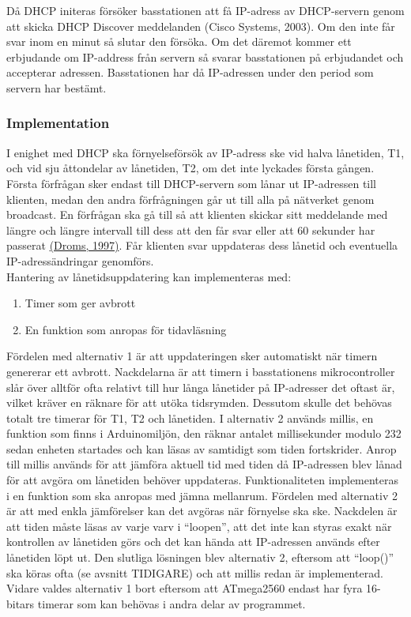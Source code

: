\documentclass[a4paper,11pt]{article}
\begin{document}
Då DHCP initeras försöker basstationen att få IP-adress av DHCP-servern genom att skicka DHCP Discover meddelanden (Cisco Systems, 2003). Om den inte får svar inom en minut så slutar den försöka. Om det däremot kommer ett erbjudande om IP-address från servern så svarar basstationen på erbjudandet och accepterar adressen. Basstationen har då IP-adressen under den period som servern har bestämt.    

\subsubsection{Implementation}
I enighet med DHCP ska förnyelseförsök av IP-adress ske vid halva lånetiden, T1, och vid sju åttondelar av lånetiden, T2, om det inte lyckades första gången. Första förfrågan sker endast till DHCP-servern som lånar ut IP-adressen till klienten, medan den andra förfrågningen går ut till alla på nätverket genom broadcast. En förfrågan ska gå till så att klienten skickar sitt meddelande med längre och längre intervall till dess att den får svar eller att 60 sekunder har passerat \hyperref[droms]{(Droms, 1997)}. Får klienten svar uppdateras dess lånetid och eventuella IP-adressändringar genomförs.\\

Hantering av lånetidsuppdatering kan implementeras med:

	\begin{enumerate}
	\item Timer som ger avbrott
    	\item En funktion som anropas för tidavläsning
	\end{enumerate}
	
Fördelen med alternativ 1 är att uppdateringen sker automatiskt när timern genererar ett avbrott. Nackdelarna är att timern i basstationens mikrocontroller slår över alltför ofta relativt till hur långa lånetider på IP-adresser det oftast är, vilket kräver en räknare för att utöka tidsrymden. Dessutom skulle det behövas totalt tre timerar för T1, T2 och lånetiden. I alternativ 2 används millis, en funktion som finns i Arduinomiljön, den räknar antalet millisekunder modulo 232 sedan enheten startades och kan läsas av samtidigt som tiden fortskrider. Anrop till millis används för att jämföra aktuell tid med tiden då IP-adressen blev lånad för att avgöra om lånetiden behöver uppdateras. Funktionaliteten implementeras i en funktion som ska anropas med jämna mellanrum. Fördelen med alternativ 2 är att med enkla jämförelser kan det avgöras när förnyelse ska ske. Nackdelen är att tiden måste läsas av varje varv i “loopen”, att det inte kan styras exakt när kontrollen av lånetiden görs och det kan hända att IP-adressen används efter lånetiden löpt ut. Den slutliga lösningen blev alternativ 2, eftersom att “loop()” ska köras ofta (se avsnitt TIDIGARE) och att millis redan är implementerad. Vidare valdes alternativ 1 bort eftersom att ATmega2560 endast har fyra 16-bitars timerar som kan behövas i andra delar av programmet.\\
\end{document}
